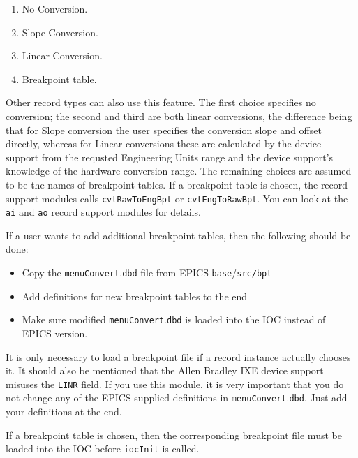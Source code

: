 \begin{enumerate}\item No Conversion.

\item {}Slope Conversion.

\item {}Linear Conversion.

\item Breakpoint table.

\end{enumerate}Other record types can also use this feature. The first choice specifies no conversion; the second and third are both linear 
conversions, the difference being that for Slope conversion the user specifies the conversion slope and offset directly, 
whereas for Linear conversions these are calculated by the device support from the requsted Engineering Units range and 
the device support's knowledge of the hardware conversion range. The remaining choices are assumed to be the names of 
breakpoint tables. If a breakpoint table is chosen, the record support modules calls \verb|cvtRawToEngBpt| or 
\verb|cvtEngToRawBpt|. You can look at the \verb|ai| and \verb|ao| record support modules for details.

If a user wants to add additional breakpoint tables, then the following should be done:

\begin{itemize}\item Copy the \verb|menuConvert|.\verb|dbd| file from EPICS \verb|base|/\verb|src/bpt|

\item Add definitions for new breakpoint tables to the end

\item Make sure modified \verb|menuConvert|.\verb|dbd| is loaded  into the IOC instead of EPICS version.

\end{itemize}It is only necessary to load a breakpoint file if a record instance actually chooses it. It should also be mentioned that the 
Allen Bradley IXE device support misuses the \verb|LINR| field. If you use this module, it is very important that you do not 
change any of the EPICS supplied definitions in \verb|menuConvert|.\verb|dbd|. Just add your definitions at the end.

If a breakpoint table is chosen, then the corresponding breakpoint file must be loaded into the IOC before \verb|iocInit| is 
called.

